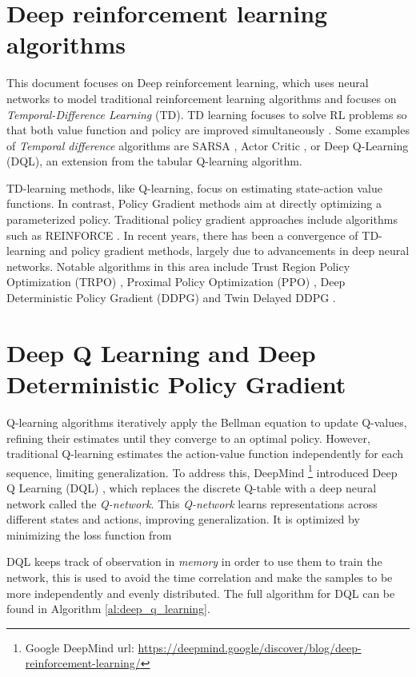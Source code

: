 \section{Deep reinforcement learning algorithms}
This document focuses on Deep reinforcement learning, which uses neural networks to model traditional reinforcement learning algorithms and focuses on \emph{Temporal-Difference Learning} (TD). TD learning focuses to solve RL problems so that both value function and policy are improved simultaneously \cite{Sutton2018}. Some examples of \emph{Temporal difference} algorithms are SARSA \cite{SARSA}, Actor Critic \cite{SAC}, or Deep Q-Learning \cite{deep_q_learning} (DQL), an extension from the tabular Q-learning algorithm.

TD-learning methods, like Q-learning, focus on estimating state-action value functions. In contrast, Policy Gradient methods aim at directly optimizing a parameterized policy. Traditional policy gradient approaches include algorithms such as REINFORCE \cite{reinforce_algorithm}. In recent years, there has been a convergence of TD-learning and policy gradient methods, largely due to advancements in deep neural networks. Notable algorithms in this area include Trust Region Policy Optimization (TRPO) \cite{TRPO}, Proximal Policy Optimization (PPO) \cite{ppo}, Deep Deterministic Policy Gradient (DDPG) \cite{ddpg} and Twin Delayed DDPG \cite{TD3}.

\section{Deep Q Learning and Deep Deterministic Policy Gradient}
Q-learning algorithms iteratively apply the Bellman equation  to update Q-values, refining their estimates until they converge to an optimal policy. However, traditional Q-learning estimates the action-value function independently for each sequence, limiting generalization. To address this, DeepMind \footnote{Google DeepMind url: \url{https://deepmind.google/discover/blog/deep-reinforcement-learning/}} introduced Deep Q Learning (DQL) \cite{deep_q_learning}, which replaces the discrete Q-table with a deep neural network called the \emph{Q-network}. This \emph{Q-network} learns representations across different states and actions, improving generalization. It is optimized by minimizing the  loss function from 

DQL keeps track of observation in \emph{memory} in order to use them to train the network, this is used to avoid the time correlation and make the samples to be more independently and evenly distributed. The full algorithm for DQL can be found in Algorithm \ref{al:deep_q_learning}.

